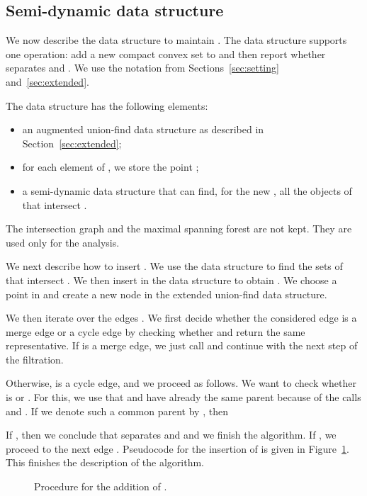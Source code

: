 \documentclass[a4paper,11pt]{article}
\begin{document}
\subsection{Semi-dynamic data structure}

We now describe the data structure to maintain .
The data structure supports one operation: add a new
compact convex set  to  and then 
report whether  separates  and .
We use the notation from Sections~\ref{sec:setting} and~\ref{sec:extended}.

The data structure has the following elements:
\begin{itemize}
	\item an augmented union-find data structure as described in Section~\ref{sec:extended};
	\item for each element  of , we store the point ;
	\item a semi-dynamic data structure  that can find, for the new , all the 
		objects of  that intersect .
\end{itemize}
The intersection graph  and the maximal spanning forest  are not kept.
They are used only for the analysis. 

We next describe how to insert .
We use the data structure  to find the sets  of 
that intersect . We then insert  in the data structure  to obtain 
. We choose a point  in 
and create a new node  in the extended union-find data structure.

We then iterate over the edges . 
We first decide whether the considered edge  is a merge edge or a cycle edge 
by checking whether 
 and 
 return the same representative.
If  is a merge edge, we just call  and continue with the next step
of the filtration.

Otherwise,  is a cycle edge, and we proceed as follows. 
We want to check whether  is  or .
For this, we use that  and  have already the same parent because of the calls 
 and .
If we denote such a common parent by , then

If , then we conclude 
that  separates  and  and we finish the algorithm.
If , we proceed to the next edge .
Pseudocode for the insertion of  is given in Figure~\ref{fig:code4}.
This finishes the description of the algorithm.

\begin{figure}[htb]
	\centering
	\caption{Procedure for the addition of .}
	\label{fig:code4}
\end{figure}
\end{document}
